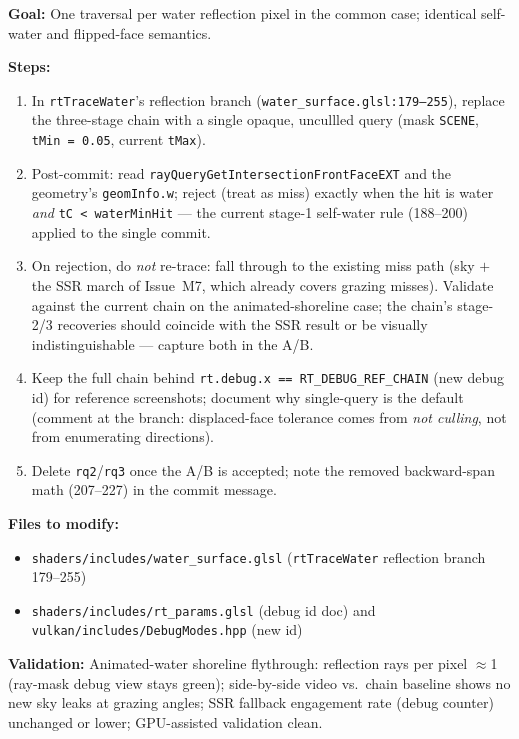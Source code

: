 \documentclass[11pt,a4paper]{article}
\begin{document}
\begin{tcolorbox}[promptbox={Prompt: Collapse the Reflection Chain to One Query with Post-Commit Classification}]
\textbf{Goal:} One traversal per water reflection pixel in the common case; identical self-water and flipped-face semantics.

\textbf{Steps:}
\begin{enumerate}
    \item In \texttt{rtTraceWater}'s reflection branch (\texttt{water\_surface.glsl:179--255}), replace the three-stage chain with a single opaque, uncullled query (mask \texttt{SCENE}, \texttt{tMin = 0.05}, current \texttt{tMax}).
    \item Post-commit: read \texttt{rayQueryGetIntersectionFrontFaceEXT} and the geometry's \texttt{geomInfo.w}; reject (treat as miss) exactly when the hit is water \emph{and} \texttt{tC < waterMinHit} --- the current stage-1 self-water rule (188--200) applied to the single commit.
    \item On rejection, do \emph{not} re-trace: fall through to the existing miss path (sky $+$ the SSR march of Issue~M7, which already covers grazing misses). Validate against the current chain on the animated-shoreline case; the chain's stage-2/3 recoveries should coincide with the SSR result or be visually indistinguishable --- capture both in the A/B.
    \item Keep the full chain behind \texttt{rt.debug.x == RT\_DEBUG\_REF\_CHAIN} (new debug id) for reference screenshots; document why single-query is the default (comment at the branch: displaced-face tolerance comes from \emph{not culling}, not from enumerating directions).
    \item Delete \texttt{rq2}/\texttt{rq3} once the A/B is accepted; note the removed backward-span math (207--227) in the commit message.
\end{enumerate}

\textbf{Files to modify:}
\begin{itemize}
    \item \texttt{shaders/includes/water\_surface.glsl} (\texttt{rtTraceWater} reflection branch 179--255)
    \item \texttt{shaders/includes/rt\_params.glsl} (debug id doc) and \texttt{vulkan/includes/DebugModes.hpp} (new id)
\end{itemize}

\textbf{Validation:} Animated-water shoreline flythrough: reflection rays per pixel $\approx$1 (ray-mask debug view stays green); side-by-side video vs.\ chain baseline shows no new sky leaks at grazing angles; SSR fallback engagement rate (debug counter) unchanged or lower; GPU-assisted validation clean.
\end{tcolorbox}
\end{document}
